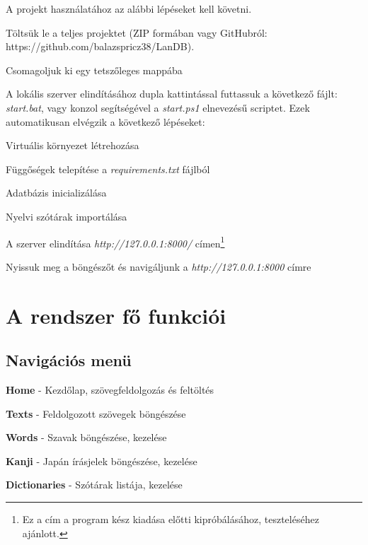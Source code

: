 A projekt használatához az alábbi lépéseket kell követni.

\begin{compactenum}
	\item\label{step:first} Töltsük le a teljes projektet (ZIP formában vagy GitHubról: https://github.com/balazspricz38/LanDB).
	\item Csomagoljuk ki egy tetszőleges mappába
	\item A lokális szerver elindításához dupla kattintással futtassuk a következő fájlt: \textit{start.bat}, vagy konzol segítségével a \textit{start.ps1} elnevezésű scriptet. Ezek automatikusan elvégzik a következő lépéseket:
    \begin{compactenum}
        \item Virtuális környezet létrehozása
        \item Függőségek telepítése a \textit{requirements.txt} fájlból
        \item Adatbázis inicializálása
        \item Nyelvi szótárak importálása
        \item A szerver elindítása \textit{http://127.0.0.1:8000/} címen\footnote{Ez a cím a program kész kiadása előtti kipróbálásához, teszteléséhez ajánlott.}
    \end{compactenum}
    \item Nyissuk meg a böngészőt és navigáljunk a \textit{http://127.0.0.1:8000} címre
\end{compactenum}

\section{A rendszer fő funkciói}

\subsection{Navigációs menü}

\begin{compactenum}
    \item \textbf{Home} - Kezdőlap, szövegfeldolgozás és feltöltés
    \item \textbf{Texts} - Feldolgozott szövegek böngészése
    \item \textbf{Words} - Szavak böngészése, kezelése
    \item \textbf{Kanji} - Japán írásjelek böngészése, kezelése
    \item \textbf{Dictionaries} - Szótárak listája, kezelése
\end{compactenum}

